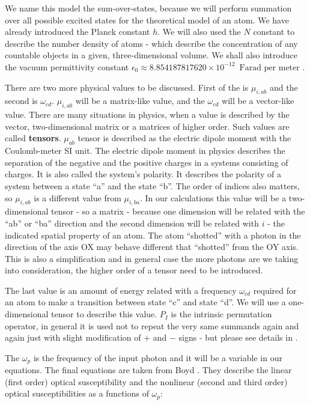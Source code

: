 \documentclass[12pt,twoside,a4paper]{article}
\numberwithin{equation}{subsection}
\numberwithin{figure}{subsection}
\begin{document}
We name this model the sum-over-states, because we will perform summation over all possible excited states for the theoretical model of an atom. We have already introduced the Planck constant $h$. We will also used the $N$ constant to describe the number density of atoms - which describe the concentration of any countable objects in a given, three-dimensional volume. We shall also introduce the vacuum permittivity constant $\epsilon_0 \approx 8.854187817620 \times 10^{-12} \, \text{ Farad per meter } $. 

There are two more physical values to be discussed. First of the is $\mu_{i, ab}$ and the second is $\omega_{cd}$. $\mu_{i, ab}$ will be a matrix-like value, and the $\omega_{cd}$ will be a vector-like value. There are many situations in physics, when a value is described by the vector, two-dimensional matrix or a matrices of higher order. Such values are called \textbf{tensors}. $\mu_{ab}$ tensor is described as the electric dipole moment with the Coulomb-meter SI unit. The electric dipole moment in physics describes the separation of the negative and the positive charges in a systems consisting of charges. It is also called the system's polarity. It describes the polarity of a system between a state ``a'' and the state ``b''. The order of indices also matters, so $\mu_{i, ab}$ is a different value from $\mu_{i, ba}$. In our calculations this value will be a two-dimensional tensor - so a matrix - because one dimension will be related with the ``ab'' or ``ba'' direction and the second dimension will be related with $i$ - the indicated spatial property of an atom. The atom ``shotted'' with a photon in the direction of the axis OX may behave different that ``shotted'' from the OY axis. This is also a simplification and in general case the more photons are we taking into consideration, the higher order of a tensor need to be introduced.

The last value is an amount of energy related with a frequency $\omega_{cd}$ required for an atom to make a transition between state ``c'' and state ``d''. We will use a one-dimensional tensor to describe this value. $P_{I}$ is the intrinsic permutation operator, in general it is used not to repeat the very same summands again and again just with slight modification of $+$ and $-$ signs - but please see details in \cite{boyd_nlo}.

The $\omega_{p}$ is the frequency of the input photon and it will be a variable in our equations. The final equations are taken from Boyd \cite{boyd_nlo}. They describe the linear (first order) optical susceptibility and the nonlinear (second and third order) optical susceptibilities as a functions of $\omega_{p}$:
\end{document}

